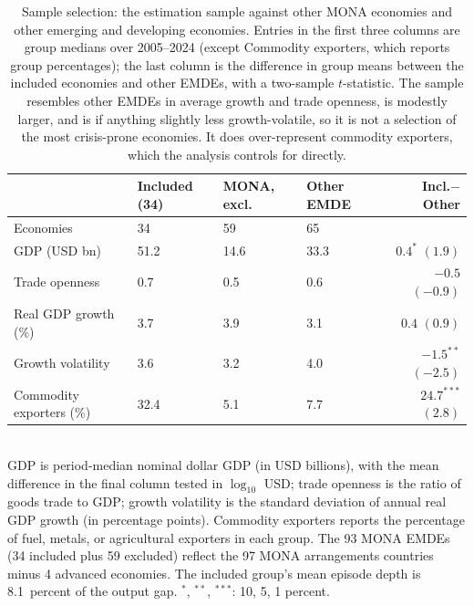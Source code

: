 \begin{table}[H]
\centering\small
\caption{Sample selection: the estimation sample against other MONA economies and other emerging and developing economies. Entries in the first three columns are group medians over 2005--2024 (except Commodity exporters, which reports group percentages); the last column is the difference in group means between the included economies and other EMDEs, with a two-sample $t$-statistic. The sample resembles other EMDEs in average growth and trade openness, is modestly larger, and is if anything slightly less growth-volatile, so it is not a selection of the most crisis-prone economies. It does over-represent commodity exporters, which the analysis controls for directly.}
\label{tab:samplecomp}
\begin{tabularx}{\textwidth}{@{}lYYYr@{}}
\toprule
& Included (34) & MONA, excl. & Other EMDE & Incl.$-$Other \\ \midrule
Economies & 34 & 59 & 65 & \\
GDP (USD bn) & 51.2 & 14.6 & 33.3 & $0.4^{*}$ {\scriptsize$(1.9)$} \\
Trade openness & 0.7 & 0.5 & 0.6 & $-0.5$ {\scriptsize$(-0.9)$} \\
Real GDP growth (\%) & 3.7 & 3.9 & 3.1 & $0.4$ {\scriptsize$(0.9)$} \\
Growth volatility & 3.6 & 3.2 & 4.0 & $-1.5^{**}$ {\scriptsize$(-2.5)$} \\
Commodity exporters (\%) & 32.4 & 5.1 & 7.7 & $24.7^{***}$ {\scriptsize$(2.8)$} \\
\bottomrule
\end{tabularx}
\\[2pt]\footnotesize{GDP is period-median nominal dollar GDP (in USD billions), with the mean difference in the final column tested in $\log_{10}$ USD; trade openness is the ratio of goods trade to GDP; growth volatility is the standard deviation of annual real GDP growth (in percentage points). Commodity exporters reports the percentage of fuel, metals, or agricultural exporters in each group. The 93 MONA EMDEs (34 included plus 59 excluded) reflect the 97 MONA arrangements countries minus 4 advanced economies. The included group's mean episode depth is 8.1~percent of the output gap. $^{*}$, $^{**}$, $^{***}$: 10, 5, 1 percent.}
\end{table}
